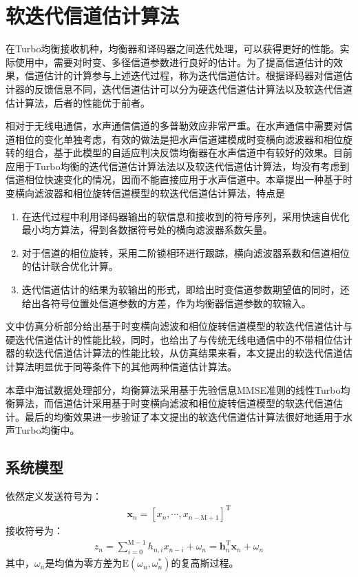 %
\chapter{软迭代信道估计算法}
\thispagestyle{empty}
在Turbo均衡接收机种，均衡器和译码器之间迭代处理，可以获得更好的性能。实际使用中，需要对时变、多径信道参数进行良好的估计。为了提高信道估计的效果，信道估计的计算参与上述迭代过程，称为迭代信道估计。根据译码器对信道估计器的反馈信息不同，迭代信道估计可以分为硬迭代信道估计算法\citep{Nefedov2003}以及软迭代信道估计算法\citep{Otnes2004,Sandell1998,Qichenhao2011}，后者的性能优于前者。

相对于无线电通信，水声通信信道的多普勒效应非常严重。在水声通信中需要对信道相位的变化单独考虑，有效的做法是把水声信道建模成时变横向滤波器和相位旋转的组合，基于此模型的自适应判决反馈均衡器在水声信道中有较好的效果\citep{Geller1996}。目前应用于Turbo均衡的迭代信道估计算法法\citep{Nefedov2003}以及软迭代信道估计算法\citep{Otnes2004,Sandell1998,Qichenhao2011}，均没有考虑到信道相位快速变化的情况，因而不能直接应用于水声信道中。本章提出一种基于时变横向滤波器和相位旋转信道模型的软迭代信道估计算法，特点是
\begin{enumerate}
    \item 在迭代过程中利用译码器输出的软信息和接收到的符号序列，采用快速自优化最小均方算法，得到各数据符号处的横向滤波器系数矢量。
    \item 对于信道的相位旋转，采用二阶锁相环进行跟踪，横向滤波器系数和信道相位的估计联合优化计算。
    \item 迭代信道估计的结果为软输出的形式，即给出时变信道参数期望值的同时，还给出各符号位置处信道参数的方差，作为均衡器信道参数的软输入。
\end{enumerate}

文中仿真分析部分给出基于时变横向滤波和相位旋转信道模型的软迭代信道估计与硬迭代信道估计的性能比较，同时，也给出了与传统无线电通信中的不带相位估计器的软迭代信道估计算法的性能比较，从仿真结果来看，本文提出的软迭代信道估计算法明显优于同等条件下的其他两种信道估计算法。

本章中海试数据处理部分，均衡算法采用基于先验信息MMSE准则的线性Turbo均衡算法，而信道估计采用基于时变横向滤波和相位旋转信道模型的软迭代信道估计。最后的均衡效果进一步验证了本文提出的软迭代信道估计算法很好地适用于水声Turbo均衡中。
\section{系统模型}
依然定义发送符号为：
\begin{eqnarray}
    \mathbf{x}_n=[x_n,\cdots,x_{n-\mathrm{M}+1}]^{\mathrm{T}}
    \label{equ:4.1}
\end{eqnarray}
接收符号为：
\begin{eqnarray}
    z_n=\sum_{i=0}^{\mathrm{M}-1}h_{n,i}x_{n-i}+\omega_n=\mathbf{h}_n^{\mathrm{T}}\mathbf{x}_n+\omega_n
    \label{equ:4.2}
\end{eqnarray}
其中，$\omega_n$是均值为零方差为$\mathrm{E}(\omega_n,\omega_n^*)$的复高斯过程。

